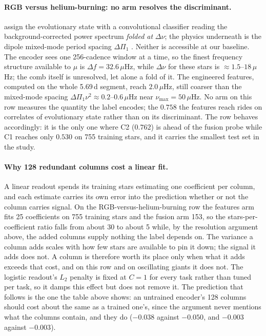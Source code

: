 \documentclass{article}
\begin{document}
\paragraph{RGB versus helium-burning: no arm resolves the discriminant.} \citet{sreenivas2026} assign
the evolutionary state with a convolutional classifier reading the background-corrected power spectrum
\emph{folded at} $\Delta\nu$; the physics underneath is the dipole mixed-mode period spacing
$\Delta\Pi_{1}$ \citep{bedding2011}. Neither is accessible at our baseline. The encoder sees one
256-cadence window at a time, so the finest frequency structure available to $\mu$ is
$\Delta f = 32.6\,\mu$Hz, while $\Delta\nu$ for these stars is $\approx 1.5$--$18\,\mu$Hz; the comb
itself is unresolved, let alone a fold of it. The engineered features, computed on the whole 5.69\,d
segment, reach $2.0\,\mu$Hz, still coarser than the mixed-mode spacing
$\Delta\Pi_{1}\nu^{2} \approx 0.2$--$0.6\,\mu$Hz near $\nu_{\max} = 50\,\mu$Hz. No arm on this row
measures the quantity the label encodes; the $0.758$ the features reach rides on correlates of
evolutionary state rather than on its discriminant. The row behaves accordingly: it is the only one
where C2 ($0.762$) is ahead of the fusion probe while C1 reaches only $0.530$ on 755 training stars,
and it carries the smallest test set in the study.

\paragraph{Why 128 redundant columns cost a linear fit.} A linear readout spends its training stars
estimating one coefficient per column, and each estimate carries its own error into the prediction
whether or not the column carries signal. On the RGB-versus-helium-burning row the features arm fits
25 coefficients on 755 training stars and the fusion arm 153, so the stars-per-coefficient ratio
falls from about 30 to about 5 while, by the resolution argument above, the added columns supply
nothing the label depends on. The variance a column adds scales with how few stars are available to
pin it down; the signal it adds does not. A column is therefore worth its place only when what it
adds exceeds that cost, and on this row and on oscillating giants it does not. The logistic readout's
$L_{2}$ penalty is fixed at $C = 1$ for every task rather than tuned per task, so it damps this effect
but does not remove it. The prediction that follows is the one the table above shows: an untrained
encoder's 128 columns should cost about the same as a trained one's, since the argument never
mentions what the columns contain, and they do ($-0.038$ against $-0.050$, and $-0.003$ against
$-0.003$).
\end{document}
